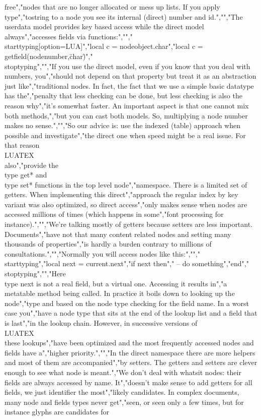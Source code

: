 free","nodes that are no longer allocated or mess up lists. If you apply \\type","{tostring} to a node you see its internal (direct) number and id.","","The userdata model provides key based access while the direct model always","accesses fields via functions:","","\\starttyping[option=LUA]","local c = nodeobject.char","local c = getfield(nodenumber,\"char\")","\\stoptyping","","If you use the direct model, even if you know that you deal with numbers, you","should not depend on that property but treat it as an abstraction just like","traditional nodes. In fact, the fact that we use a simple basic datatype has the","penalty that less checking can be done, but less checking is also the reason why","it's somewhat faster. An important aspect is that one cannot mix both methods,","but you can cast both models. So, multiplying a node number makes no sense.","","So our advice is: use the indexed (table) approach when possible and investigate","the direct one when speed might be a real issue. For that reason \\LUATEX\\ also","provide the \\type {get*} and \\type {set*} functions in the top level node","namespace. There is a limited set of getters. When implementing this direct","approach the regular index by key variant was also optimized, so direct access","only makes sense when nodes are accessed millions of times (which happens in some","font processing for instance).","","We're talking mostly of getters because setters are less important. Documents","have not that many content related nodes and setting many thousands of properties","is hardly a burden contrary to millions of consultations.","","Normally you will access nodes like this:","","\\starttyping","local next = current.next","if next then","    -- do something","end","\\stoptyping","","Here \\type {next} is not a real field, but a virtual one. Accessing it results in","a metatable method being called. In practice it boils down to looking up the node","type and based on the node type checking for the field name. In a worst case you","have a node type that sits at the end of the lookup list and a field that is last","in the lookup chain. However, in successive versions of \\LUATEX\\ these lookups","have been optimized and the most frequently accessed nodes and fields have a","higher priority.","","In the direct namespace there are more helpers and most of them are accompanied","by setters. The getters and setters are clever enough to see what node is meant.","We don't deal with whatsit nodes: their fields are always accessed by name. It","doesn't make sense to add getters for all fields, we just identifier the most","likely candidates. In complex documents, many node and fields types never get","seen, or seen only a few times, but for instance glyphs are candidates for 